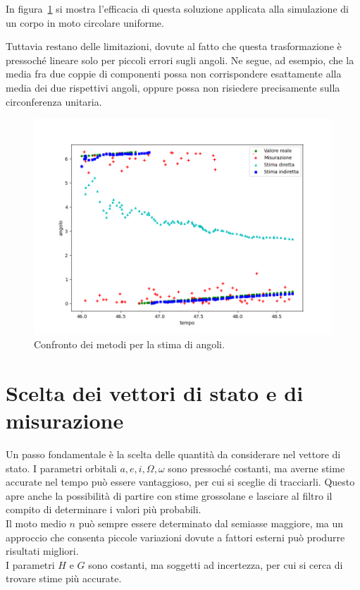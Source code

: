 \documentclass[12pt,a4paper,openright,twoside]{book}
\begin{document}
In figura~\ref{fig:angle-method-comparison} si mostra l'efficacia di questa soluzione applicata alla simulazione di un corpo in moto circolare uniforme.

Tuttavia restano delle limitazioni, dovute al fatto che questa trasformazione è pressoché lineare solo per piccoli errori sugli angoli. Ne segue, ad esempio, che la media fra due coppie di componenti possa non corrispondere esattamente alla media dei due rispettivi angoli, oppure possa non risiedere precisamente sulla circonferenza unitaria.

\begin{figure}
    \centering
    \includegraphics[width=\linewidth]{figures/angle-method-comparison.png}
    \caption{Confronto dei metodi per la stima di angoli.}
    \label{fig:angle-method-comparison}
    \vspace{2\baselineskip}
\end{figure}

\section{Scelta dei vettori di stato e di misurazione}

Un passo fondamentale è la scelta delle quantità da considerare nel vettore di stato. I parametri orbitali $a,e,i,\Omega,\omega$ sono pressoché costanti, ma averne stime accurate nel tempo può essere vantaggioso, per cui si sceglie di tracciarli. Questo apre anche la possibilità di partire con stime grossolane e lasciare al filtro il compito di determinare i valori più probabili. \\
Il moto medio $n$ può sempre essere determinato dal semiasse maggiore, ma un approccio che consenta piccole variazioni dovute a fattori esterni può produrre risultati migliori. \\
I parametri $H$ e $G$ sono costanti, ma soggetti ad incertezza, per cui si cerca di trovare stime più accurate. \\
\end{document}
